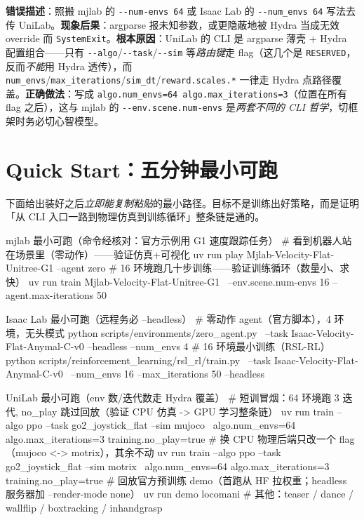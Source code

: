 \begin{pitfall}
\textbf{错误描述}：照搬 mjlab 的 \verb|--num-envs 64| 或 Isaac Lab 的 \verb|--num_envs 64| 写法去传 UniLab。\textbf{现象后果}：argparse 报未知参数，或更隐蔽地被 Hydra 当成无效 override 而 \verb|SystemExit|。\textbf{根本原因}：UniLab 的 CLI 是 argparse 薄壳 + Hydra 配置组合——只有 \verb|--algo|/\verb|--task|/\verb|--sim| 等\emph{路由键}走 flag（这几个是 \texttt{RESERVED}，反而\emph{不能}用 Hydra 透传），而 \verb|num_envs|/\verb|max_iterations|/\verb|sim_dt|/\verb|reward.scales.*| 一律走 Hydra 点路径覆盖。\textbf{正确做法}：写成 \verb|algo.num_envs=64 algo.max_iterations=3|（位置在所有 flag 之后），这与 mjlab 的 \verb|--env.scene.num-envs| 是\emph{两套不同的 CLI 哲学}，切框架时务必切心智模型。
\end{pitfall}

\section{Quick Start：五分钟最小可跑}
\label{sec:rlmc-setup-quickstart}

下面给出装好之后\emph{立即能复制粘贴}的最小路径。目标不是训练出好策略，而是证明「从 CLI 入口一路到物理仿真到训练循环」整条链是通的。

\begin{codebox}[bash]{mjlab 最小可跑（命令经核对：官方示例用 G1 速度跟踪任务）}
# 看到机器人站在场景里（零动作）——验证仿真+可视化
uv run play Mjlab-Velocity-Flat-Unitree-G1 --agent zero
# 16 环境跑几十步训练——验证训练循环（数量小、求快）
uv run train Mjlab-Velocity-Flat-Unitree-G1 \
    --env.scene.num-envs 16 --agent.max-iterations 50
\end{codebox}

\begin{codebox}[bash]{Isaac Lab 最小可跑（远程务必 --headless）}
# 零动作 agent（官方脚本），4 环境，无头模式
python scripts/environments/zero_agent.py \
    --task Isaac-Velocity-Flat-Anymal-C-v0 --headless --num_envs 4
# 16 环境最小训练（RSL-RL）
python scripts/reinforcement_learning/rsl_rl/train.py \
    --task Isaac-Velocity-Flat-Anymal-C-v0 \
    --num_envs 16 --max_iterations 50 --headless
\end{codebox}

\begin{codebox}[bash]{UniLab 最小可跑（env 数/迭代数走 Hydra 覆盖）}
# 短训冒烟：64 环境跑 3 迭代, no_play 跳过回放（验证 CPU 仿真 -> GPU 学习整条链）
uv run train --algo ppo --task go2_joystick_flat --sim mujoco \
    algo.num_envs=64 algo.max_iterations=3 training.no_play=true
# 换 CPU 物理后端只改一个 flag（mujoco <-> motrix），其余不动
uv run train --algo ppo --task go2_joystick_flat --sim motrix \
    algo.num_envs=64 algo.max_iterations=3 training.no_play=true
# 回放官方预训练 demo（首跑从 HF 拉权重；headless 服务器加 --render-mode none）
uv run demo locomani         # 其他：teaser / dance / wallflip / boxtracking / inhandgrasp
\end{codebox}

